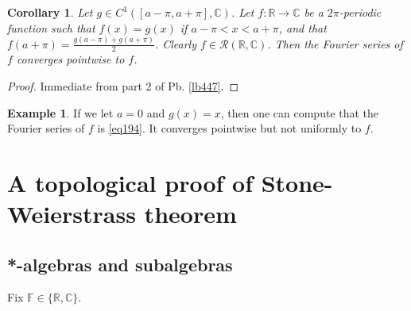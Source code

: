 \documentclass[12pt,b5paper,notitlepage]{article}
\theoremstyle{definition}
\newtheorem{eg}[df]{Example}
\theoremstyle{plain}
\newtheorem{co}[df]{Corollary}
\newcommand{\scr}{\mathscr}
\newcommand{\Cbb}{\mathbb C}
\newcommand{\Rbb}{\mathbb R}
\newcommand{\Fbb}{\mathbb F}
\newcommand{\dps}{\displaystyle}
\numberwithin{equation}{section}
\begin{document}
\begin{co}\label{lb448}
Let $g\in C^1([a-\pi,a+\pi],\Cbb)$. Let $f:\Rbb\rightarrow\Cbb$ be a $2\pi$-periodic function such that $f(x)=g(x)$ if $a-\pi<x<a+\pi$, and that $\dps f(a+\pi)=\frac{g(a-\pi)+g(a+\pi)}2$. Clearly $f\in\scr R(\Rbb,\Cbb)$. Then the Fourier series of $f$ converges pointwise to $f$.
\end{co}

\begin{proof}
Immediate from part 2 of Pb. \ref{lb447}.
\end{proof}

\begin{eg}
If we let $a=0$ and $g(x)=x$, then one can compute that the Fourier series of $f$ is \eqref{eq194}. It converges pointwise but not uniformly to $f$.
\end{eg}



















\newpage



\section{A topological proof of Stone-Weierstrass theorem}



\subsection{*-algebras and subalgebras}

Fix $\Fbb\in\{\Rbb,\Cbb\}$.
\end{document}
